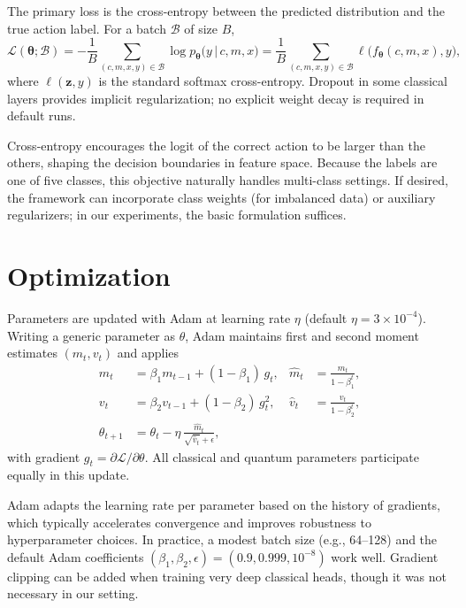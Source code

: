 \documentclass[11pt]{article}
\begin{document}
The primary loss is the cross-entropy between the predicted distribution and the true action label. For a batch $\mathcal{B}$ of size $B$,
\begin{equation}
  \mathcal{L}(\bm{\theta}; \mathcal{B}) = -\frac{1}{B} \sum_{(c,m,x,y)\in\mathcal{B}} \log p_{\bm{\theta}}\big(y\,\big|\,c,m,x\big)
  = \frac{1}{B} \sum_{(c,m,x,y)\in\mathcal{B}} \ell\big(f_{\bm{\theta}}(c,m,x), y\big),
\end{equation}
where $\ell(\bm{z}, y)$ is the standard softmax cross-entropy. Dropout in some classical layers provides implicit regularization; no explicit weight decay is required in default runs.

Cross-entropy encourages the logit of the correct action to be larger than the others, shaping the decision boundaries in feature space. Because the labels are one of five classes, this objective naturally handles multi-class settings. If desired, the framework can incorporate class weights (for imbalanced data) or auxiliary regularizers; in our experiments, the basic formulation suffices.

\section{Optimization}

Parameters are updated with Adam at learning rate $\eta$ (default $\eta=3\times10^{-4}$). Writing a generic parameter as $\theta$, Adam maintains first and second moment estimates $(m_t, v_t)$ and applies
\begin{align}
  m_t &= \beta_1 m_{t-1} + (1-\beta_1) \, g_t, & \hat{m}_t &= \frac{m_t}{1-\beta_1^t},\\
  v_t &= \beta_2 v_{t-1} + (1-\beta_2) \, g_t^2, & \hat{v}_t &= \frac{v_t}{1-\beta_2^t},\\
  \theta_{t+1} &= \theta_t - \eta \, \frac{\hat{m}_t}{\sqrt{\hat{v}_t}+\epsilon},
\end{align}
with gradient $g_t = \partial \mathcal{L}/\partial \theta$. All classical and quantum parameters participate equally in this update.

Adam adapts the learning rate per parameter based on the history of gradients, which typically accelerates convergence and improves robustness to hyperparameter choices. In practice, a modest batch size (e.g., 64--128) and the default Adam coefficients $(\beta_1,\beta_2,\epsilon)=(0.9,0.999,10^{-8})$ work well. Gradient clipping can be added when training very deep classical heads, though it was not necessary in our setting.
\end{document}
